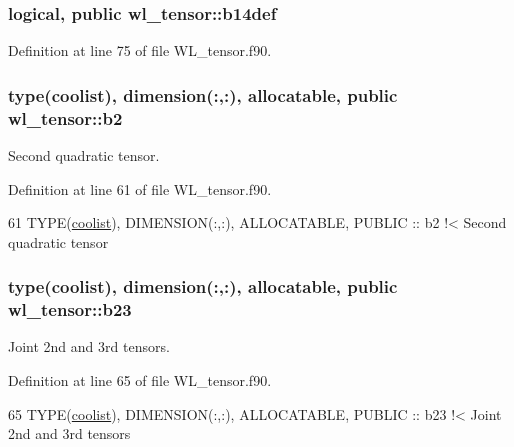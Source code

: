 \subsubsection[{\texorpdfstring{b14def}{b14def}}]{\setlength{\rightskip}{0pt plus 5cm}logical, public wl\+\_\+tensor\+::b14def}\hypertarget{namespacewl__tensor_a29f327d70916dfce23a1a2e20799227a}{}\label{namespacewl__tensor_a29f327d70916dfce23a1a2e20799227a}


Definition at line 75 of file W\+L\+\_\+tensor.\+f90.

\subsubsection[{\texorpdfstring{b2}{b2}}]{\setlength{\rightskip}{0pt plus 5cm}type({\bf coolist}), dimension(\+:,\+:), allocatable, public wl\+\_\+tensor\+::b2}\hypertarget{namespacewl__tensor_a297e5f32373d65ccaeaba0c5b00fb27c}{}\label{namespacewl__tensor_a297e5f32373d65ccaeaba0c5b00fb27c}


Second quadratic tensor. 



Definition at line 61 of file W\+L\+\_\+tensor.\+f90.


\begin{DoxyCode}
61   \textcolor{keywordtype}{TYPE}(\hyperlink{structtensor_1_1coolist}{coolist}), \textcolor{keywordtype}{DIMENSION(:,:)}, \textcolor{keywordtype}{ALLOCATABLE}, \textcolor{keywordtype}{PUBLIC} :: b2\textcolor{comment}{    !< Second quadratic tensor}
\end{DoxyCode}
\subsubsection[{\texorpdfstring{b23}{b23}}]{\setlength{\rightskip}{0pt plus 5cm}type({\bf coolist}), dimension(\+:,\+:), allocatable, public wl\+\_\+tensor\+::b23}\hypertarget{namespacewl__tensor_a5bc7875af2f8e170302f6d8856010ce3}{}\label{namespacewl__tensor_a5bc7875af2f8e170302f6d8856010ce3}


Joint 2nd and 3rd tensors. 



Definition at line 65 of file W\+L\+\_\+tensor.\+f90.


\begin{DoxyCode}
65   \textcolor{keywordtype}{TYPE}(\hyperlink{structtensor_1_1coolist}{coolist}), \textcolor{keywordtype}{DIMENSION(:,:)}, \textcolor{keywordtype}{ALLOCATABLE}, \textcolor{keywordtype}{PUBLIC} :: b23\textcolor{comment}{   !< Joint 2nd and 3rd tensors}
\end{DoxyCode}
